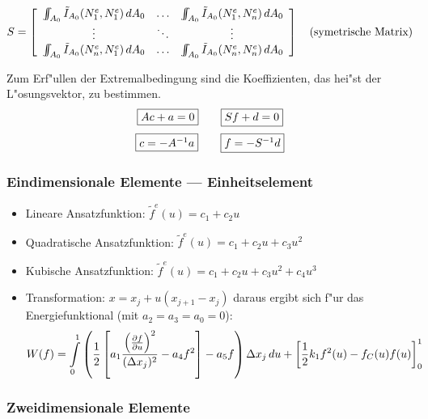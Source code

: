 $$S=\left[\begin{array}{ccc}
 \IINT_{A_0}\tilde{I}_{A_0}(N^e_1,N^e_1)\, dA_0 & \ldots & \IINT_{A_0}\tilde{I}_{A_0}(N^e_1,N^e_n)\, dA_0 \\
          \vdots                  & \ddots &            \vdots              \\
 \IINT_{A_0}\tilde{I}_{A_0}(N^e_n,N^e_1)\, dA_0 & \ldots & \IINT_{A_0}\tilde{I}_{A_0}(N^e_n,N^e_n)\, dA_0 \\
 \end{array}\right] \quad \mbox{(symetrische Matrix)}$$

Zum Erf"ullen der Extremalbedingung sind die Koeffizienten, das hei"st der
L"osungsvektor, zu bestimmen.
$$\fbox{$ A c +a = 0 $}\qquad\fbox{$ S f + d = 0 $}$$
$$\fbox{$c=-A^{-1}a$}\qquad\fbox{$f=-S^{-1}d$}$$

\subsubsection{Eindimensionale Elemente --- Einheitselement}
\begin{itemize}
\item Lineare Ansatzfunktion: $\tilde{f}^e(u)=c_1+c_2u$
\item Quadratische Ansatzfunktion: $\tilde{f}^e(u)=c_1+c_2u+c_3u^2$
\item Kubische Ansatzfunktion: $\tilde{f}^e(u)=c_1+c_2u+c_3u^2+c_4u^3$
\item Transformation: $x=x_j+u(x_{j+1}-x_j)$ daraus ergibt sich f"ur das
      Energiefunktional (mit $a_2=a_3=a_0=0$):
      $$W(f)=\int\limits_0^1 \left(\frac{1}{2} \left[ a_1
      \frac{\left(\frac{\partial f}{\partial u}\right)^2}{(\Delta x_j)^2} - a_4
      f^2 \right] -a_5 f \right) \Delta x_j \, du + \left[ \frac{1}{2} k_1
      f^2(u) -f_C(u)f(u)\right]_0^1$$
\end{itemize}

\subsubsection{Zweidimensionale Elemente}

